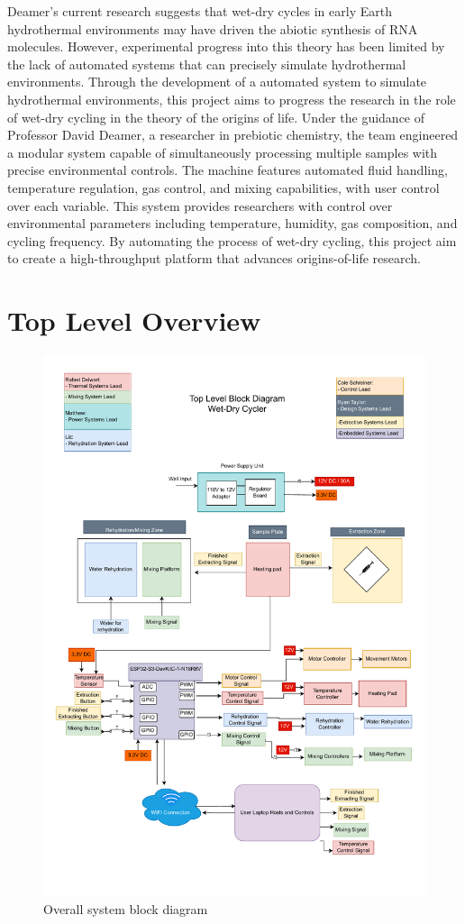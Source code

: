 \documentclass[12pt]{article}
\begin{document}
    Deamer's current research suggests that wet-dry cycles in early Earth hydrothermal environments may have driven the abiotic synthesis of RNA molecules. However, experimental progress into this theory has been limited by the lack of automated systems that can precisely simulate hydrothermal environments. Through the development of a automated system to simulate hydrothermal environments, this project aims to progress the research in the role of wet-dry cycling in the theory of the origins of life. Under the guidance of Professor David Deamer, a researcher in prebiotic chemistry, the team engineered a modular system capable of simultaneously processing multiple samples with precise environmental controls. The machine features automated fluid handling, temperature regulation, gas control, and mixing capabilities, with user control over each variable. This system provides researchers with control over environmental parameters including temperature, humidity, gas composition, and cycling frequency. By automating the process of wet-dry cycling, this project aim to create a high-throughput platform that advances origins-of-life research. 
    
   

\section{Top Level Overview}

    \begin{figure}[H]
        \centering
        \includegraphics[width=.8\textwidth]{Top_Level_V3.1.drawio.pdf}
        \caption{Overall system block diagram}
        \label{fig:Block_Diagram}
    \end{figure}
    
\end{document}
